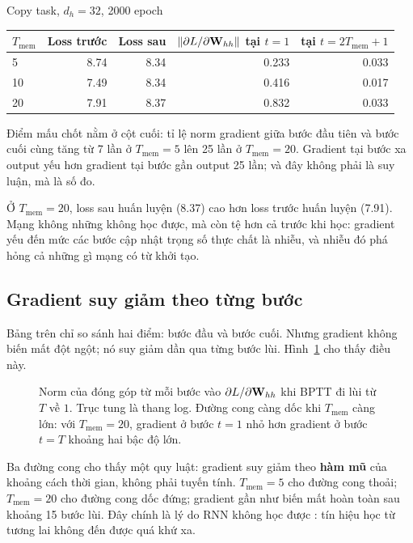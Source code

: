 \begin{measured}{Copy task, $d_h = 32$, 2000 epoch}
\small
\begin{tabular}{@{}lrrrr@{}}
\toprule
$T_{\text{mem}}$ & Loss trước & Loss sau &
$\|\partial L / \partial \mathbf{W}_{hh}\|$ tại $t=1$ & tại $t=2T_{\text{mem}}+1$ \\
\midrule
5  & 8.74 & 8.34 & 0.233 & 0.033 \\
10 & 7.49 & 8.34 & 0.416 & 0.017 \\
20 & 7.91 & 8.37 & 0.832 & 0.033 \\
\bottomrule
\end{tabular}
\normalsize
\end{measured}

Điểm mấu chốt nằm ở cột cuối: tỉ lệ norm gradient giữa bước đầu tiên và bước
cuối cùng tăng từ 7 lần ở $T_{\text{mem}} = 5$ lên 25 lần ở $T_{\text{mem}}
= 20$. Gradient tại bước xa output yếu hơn gradient tại bước gần output 25
lần; và đây không phải là suy luận, mà là số đo.

Ở $T_{\text{mem}} = 20$, loss sau huấn luyện (8.37) cao hơn loss trước
huấn luyện (7.91). Mạng không những không học được, mà còn tệ hơn cả trước
khi học: gradient yếu đến mức các bước cập nhật trọng số thực chất là nhiễu,
và nhiễu đó phá hỏng cả những gì mạng có từ khởi tạo.

\subsection{Gradient suy giảm theo từng bước}

Bảng trên chỉ so sánh hai điểm: bước đầu và bước cuối. Nhưng gradient không
biến mất đột ngột; nó suy giảm dần qua từng bước lùi. Hình~\ref{fig:ch02-gradient-decay}
cho thấy điều này.

\begin{figure}[ht]
  \centering
  
  \caption{Norm của đóng góp từ mỗi bước vào $\partial L / \partial
    \mathbf{W}_{hh}$ khi BPTT đi lùi từ $T$ về $1$. Trục tung là thang log.
    Đường cong càng dốc khi $T_{\text{mem}}$ càng lớn: với $T_{\text{mem}} = 20$,
    gradient ở bước $t=1$ nhỏ hơn gradient ở bước $t=T$ khoảng hai bậc độ lớn.}
  \label{fig:ch02-gradient-decay}
\end{figure}

Ba đường cong cho thấy một quy luật: gradient suy giảm theo \textbf{hàm mũ}
của khoảng cách thời gian, không phải tuyến tính. $T_{\text{mem}} = 5$ cho
đường cong thoải; $T_{\text{mem}} = 20$ cho đường cong dốc đứng; gradient
gần như biến mất hoàn toàn sau khoảng 15 bước lùi. Đây chính là lý do RNN
không học được : tín hiệu học từ
tương lai không đến được
quá khứ xa.

%
